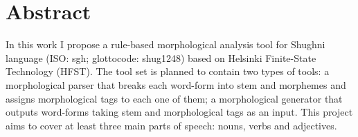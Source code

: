 \section*{Abstract}

In this work I propose a rule-based morphological analysis tool for Shughni language (ISO: sgh; glottocode: shug1248)  based on Helsinki Finite-State Technology (HFST). The tool set is planned to contain two types of tools: a morphological parser that breaks each word-form into stem and morphemes and assigns morphological tags to each one of them; a morphological generator that outputs word-forms taking stem and morphological tags as an input. This project aims to cover at least three main parts of speech: nouns, verbs and adjectives. 

\newpage